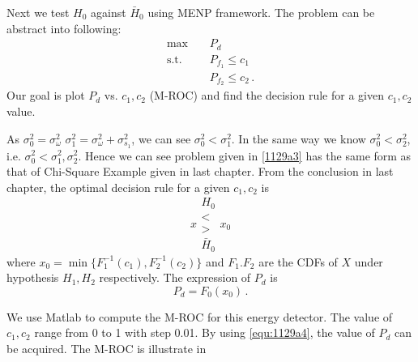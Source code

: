 Next we test $H_0$ against $\bar{H}_0$ using MENP framework. The problem can be abstract into following:
\begin{equation}
  \begin{split}
	\max\;\;\;\;&P_d\\
	\text{s.t.}\;\;\;\;&P_{f_1}\leq c_1\\
	&P_{f_2} \leq c_2\,.
  \end{split}
  \label{1129a3}
\end{equation}
Our goal is plot $P_d$ vs. $c_1, c_2$ (M-ROC) and find the decision rule for a given $c_1, c_2$ value.

As $\sigma_0^2 = \sigma_\omega^2$ $\sigma_1^2 = \sigma_\omega^2 + \sigma_{s_1}^2$, we can see $\sigma_0^2 < \sigma_1^2 $. In the same way we know $\sigma_0^2 < \sigma_2^2$, i.e. $\sigma_0^2 < \sigma_1^2, \sigma_2^2$. Hence we can see problem given in \eqref{1129a3} has the same form as that of Chi-Square Example given in last chapter. From the conclusion in last chapter, the optimal  decision rule for a given $c_1, c_2$ is 
\begin{equation}
  x \substack{H_0 \\ < \\ > \\ \bar{H}_0} x_0
  \label{equ:1129a4}
\end{equation}
where $x_0 = \min\{F_1^{-1}(c_1),  F_2^{-1}(c_2)\}$ and $F_1. F_2$ are the CDFs of $X$ under hypothesis $H_1, H_2$ respectively. The expression of $P_d$ is 
\begin{equation}
  P_d = F_0(x_0)\,.
  \label{equ:1129a4}
\end{equation}

We use Matlab to compute the M-ROC for this energy detector. The value of $c_1, c_2$ range from 0 to 1 with step 0.01. By using \eqref{equ:1129a4}, the value of $P_d$ can be acquired. The M-ROC is illustrate in 
